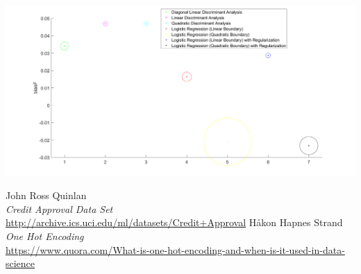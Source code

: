 \documentclass[a4paper,8pt]{article}
\newenvironment{Figure}
  {\par\medskip\noindent\minipage{\linewidth}}
  {\endminipage\par\medskip}
\begin{document}
\begin{Figure}
 \centering
 \includegraphics[width=\linewidth]{BVP}
\end{Figure}

\begin{thebibliography}{10}
	John Ross Quinlan \\
	\emph{Credit Approval Data Set} \\
	\url{http://archive.ics.uci.edu/ml/datasets/Credit+Approval}
	Håkon Hapnes Strand \\
	\emph{One Hot Encoding} \\
	\url{https://www.quora.com/What-is-one-hot-encoding-and-when-is-it-used-in-data-science}
	
\end{thebibliography}
\end{document}
